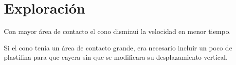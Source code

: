 \section{Exploración}

Con mayor área de contacto el cono disminui la velocidad en
menor tiempo.

Si el cono tenía un área de contacto grande, era necesario
incluir un poco de plastilina para que cayera sin que
se modificara su desplazamiento vertical.
